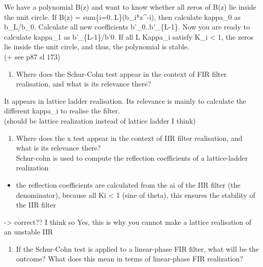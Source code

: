 \documentclass[
  a4paper,
  ,captions=tableheading
]{scrartcl}
\providecommand{\tightlist}{%
  \setlength{\itemsep}{0pt}\setlength{\parskip}{0pt}}
\begin{document}
We have a polynomial B(z) and want to know whether all zeros of B(z) lie
inside the unit circle. If B(z) = sum\{i=0..L\}(b\_i*z\^{}-i), then
calculate kappa\_0 as b\_L/b\_0. Calculate all new coefficients
b'\_0..b'\_\{L-1\}. Now you are ready to calculate kappa\_1 as
b'\_\{L-1\}/b'0. If all L Kappa\_i satisfy \textbar K\_i\textbar{}
\textless{} 1, the zeros lie inside the unit circle, and thus, the
polynomial is stable.\\
(+ see p87 sl 173)

\begin{enumerate}
\def\labelenumi{\arabic{enumi}.}
\setcounter{enumi}{1}
\tightlist
\item
  Where does the Schur-Cohn test appear in the context of FIR filter
  realisation, and what is its relevance there?
\end{enumerate}

It appears in lattice ladder realisation. Its relevance is mainly to
calculate the different kappa\_i to realise the filter.\\
(should be lattice realization instead of lattice ladder I think)

\begin{enumerate}
\def\labelenumi{\arabic{enumi}.}
\setcounter{enumi}{2}
\tightlist
\item
  Where does the x test appear in the context of IIR filter realisation,
  and what is its relevance there?\\
  Schur-cohn is used to compute the reflection coefficients of a
  lattice-ladder realization\\
\end{enumerate}

\begin{itemize}
\tightlist
\item
  the reflection coefficients are calculated from the ai of the IIR
  filter (the denominator), because all Ki \textless{} 1 (sine of
  theta), this ensures the stability of the IIR filter
\end{itemize}

-\textgreater{} correct?? I think so Yes, this is why you cannot make a
lattice realisation of an unstable IIR

\begin{enumerate}
\def\labelenumi{\arabic{enumi}.}
\setcounter{enumi}{3}
\tightlist
\item
  If the Schur-Cohn test is applied to a linear-phase FIR filter, what
  will be the outcome? What does this mean in terms of linear-phase FIR
  realization?
\end{enumerate}
\end{document}
